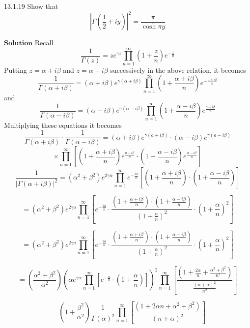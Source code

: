 \begin{mybox}{13.1.19}
Show that 
$$\left|\Gamma(\frac{1}{2}+i y)\right|^{2}=\frac{\pi}{\cosh \pi y}$$
\end{mybox}


$\boxed{\textbf{Solution}}$ Recall 
$$
\frac{1}{\Gamma(z)}=z e^{\gamma z} \prod_{n=1}^{\infty}\left(1+\frac{z}{n}\right) e^{-\frac{z}{n}}
$$
Putting $z=\alpha+i \beta$ and $z=\alpha-i \beta$ successively in the above relation, it becomes
$$
\frac{1}{\Gamma(\alpha+i \beta)}=(\alpha+i \beta) e^{\gamma(\alpha+i \beta)} \prod_{n=1}^{\infty}\left(1+\frac{\alpha+i \beta}{n}\right) e^{-\frac{a+i \beta}{n}}
$$
and 
$$
\frac{1}{\Gamma(\alpha-i \beta)}=(\alpha-i \beta) e^{\gamma(\alpha-i \beta)} \prod_{n=1}^{\infty}\left(1+\frac{\alpha-i \beta}{n}\right) e^{\frac{a-i \beta}{n}}
$$
Multiplying these equations it becomes
$$
\frac{1}{\Gamma(\alpha+i \beta)} \cdot \frac{1}{\Gamma(\alpha-i \beta)}=(\alpha+i \beta) e^{\gamma(a+i \beta)} \cdot(\alpha-i \beta) e^{\gamma(a-i \beta)}$$
$$\times \prod_{n=1}^{\infty}\left[\left(1+\frac{\alpha+i \beta}{n}\right) e^{\frac{a+i \beta}{n}} \cdot\left(1+\frac{\alpha-i \beta}{n}\right) e^{\frac{\alpha-i \beta}{n}}\right]
$$
$$
\frac{1}{|\Gamma(\alpha+i \beta)|^{2}}=\left(\alpha^{2}+\beta^{2}\right) e^{2\gamma \alpha} \prod_{n=1}^{\infty} e^{-\frac{2 a}{n}}\left[\left(1+\frac{\alpha+i \beta}{n}\right) \cdot\left(1+\frac{\alpha-i \beta}{n}\right)\right]
$$


$$
=\left(\alpha^{2}+\beta^{2}\right) e^{2 \gamma a} \prod_{n=1}^{\infty}\left[e^{-\frac{2 a}{n}} \cdot \frac{\left(1+\frac{\alpha+i \beta}{n}\right) \cdot\left(1+\frac{\alpha-i \beta}{n}\right)}{\left(1+\frac{\alpha}{n}\right)^{2}} \cdot\left(1+\frac{\alpha}{n}\right)^{2}\right]
$$

$$
=\left(\alpha^{2}+\beta^{2}\right) e^{2 \gamma a} \prod_{n=1}^{\infty}\left[e^{-\frac{2 a}{n}} \cdot \frac{\left(1+\frac{\alpha+i \beta}{n}\right) \cdot\left(1+\frac{\alpha-i \beta}{n}\right)}{\left(1+\frac{\alpha}{n}\right)^{2}} \cdot\left(1+\frac{\alpha}{n}\right)^{2}\right]
$$

$$
=\left(\frac{\alpha^{2}+\beta^{2}}{\alpha^{2}}\right)\left(\alpha e^{\gamma \alpha} \prod_{n=1}^{\infty}\left[e^{-\frac{a}{n}} \cdot\left(1+\frac{\alpha}{n}\right)\right]\right)^{2} \prod_{n=1}^{\infty}\left[\frac{\left(1+\frac{2 \alpha}{n}+\frac{\alpha^{2}+\beta^{2}}{n^{2}}\right)}{\frac{(n+\alpha)^{2}}{n^{2}}}\right]
$$


$$
=\left(1+\frac{\beta^{2}}{\alpha^{2}}\right) \frac{1}{\Gamma(\alpha)^{2}} \prod_{n=1}^{\infty}\left[\frac{\left(1+2 \alpha n+\alpha^{2}+\beta^{2}\right)}{(n+\alpha)^{2}}\right]
$$

